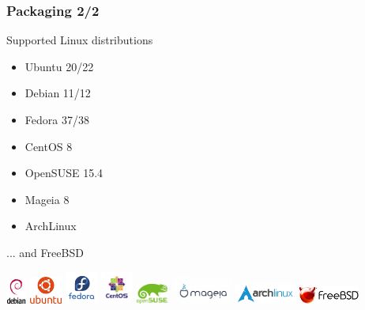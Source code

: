 \documentclass[aspectratio=169]{beamer}
\begin{document}
\begin{frame}
\frametitle{Packaging 2/2}
\begin{block}{Supported Linux distributions}
\begin{itemize}
\item Ubuntu 20/22
\item Debian 11/12
\item Fedora 37/38
\item CentOS 8
\item OpenSUSE 15.4
\item Mageia 8
\item ArchLinux
\end{itemize}

... and FreeBSD

\end{block}


\begin{center}
\includegraphics[width=0.05\textwidth]{figures/debian-openlogo-100}
\includegraphics[width=0.08\textwidth]{figures/ubuntu}
\includegraphics[width=0.08\textwidth]{figures/Fedora-Logo}
\includegraphics[width=0.08\textwidth]{figures/centos-logo}
\includegraphics[width=0.08\textwidth]{figures/opensuse-logo}
\includegraphics[width=0.15\textwidth]{figures/200px-Logo_mageia_official}
\includegraphics[width=0.15\textwidth]{figures/archlinux-logo}
\includegraphics[width=0.15\textwidth]{figures/FREEBSD_Logo_Horiz_Pos_RGB}
\end{center}

\end{frame}
\end{document}
